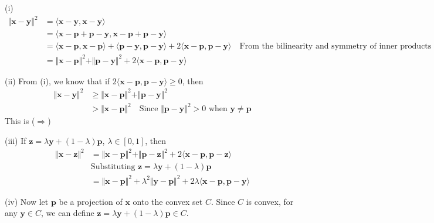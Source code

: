 \documentclass{article}
\newcommand{\inprod}[1]{\langle #1 \rangle}
\begin{document}
	\noindent(i)
	\begin{align*}
	\Vert \mathbf{x} - \mathbf{y} \Vert^2 &= \inprod{\mathbf{x}-\mathbf{y}, \mathbf{x}-\mathbf{y}} \\
	&= \inprod{\mathbf{x} - \mathbf{p} + \mathbf{p} - \mathbf{y}, \mathbf{x} - \mathbf{p} + \mathbf{p} - \mathbf{y}} \\
	&= \inprod{\mathbf{x} - \mathbf{p}, \mathbf{x} - \mathbf{p}} + \inprod{\mathbf{p} - \mathbf{y}, \mathbf{p} - \mathbf{y}} + 2 \inprod{\mathbf{x} - \mathbf{p}, \mathbf{p} - \mathbf{y}} \quad \text{From the bilinearity and symmetry of inner products} \\
	&= \Vert \mathbf{x} - \mathbf{p} \Vert^2 + \Vert \mathbf{p} - \mathbf{y} \Vert^2 + 2 \inprod{\mathbf{x} - \mathbf{p}, \mathbf{p} - \mathbf{y}}
	\end{align*}
	
	\noindent(ii)
	From (i), we know that if $2 \inprod{\mathbf{x} - \mathbf{p}, \mathbf{p} - \mathbf{y}} \geq 0$, then
	\begin{align*}
	\Vert \mathbf{x} - \mathbf{y} \Vert^2 &\geq \Vert \mathbf{x} - \mathbf{p} \Vert^2 + \Vert \mathbf{p} - \mathbf{y} \Vert^2  \\
	&> \Vert \mathbf{x} - \mathbf{p} \Vert^2 \quad \text{Since } \Vert\mathbf{p} - \mathbf{y} \Vert^2 > 0 \text{ when }\mathbf{y} \neq \mathbf{p}
	\end{align*}
	This is ($\Rightarrow$)
	
	\noindent(iii)
	If $\mathbf{z} = \lambda \mathbf{y} + (1 - \lambda) \mathbf{p}$, $\lambda \in [0,1]$, then 
	\begin{align*}
	\Vert \mathbf{x} - \mathbf{z} \Vert^2 &= \Vert \mathbf{x} - \mathbf{p} \Vert^2 + \Vert \mathbf{p} - \mathbf{z} \Vert^2 + 2 \inprod{\mathbf{x} - \mathbf{p}, \mathbf{p} - \mathbf{z}} \\
	& \text{Substituting } \mathbf{z} = \lambda \mathbf{y} + (1- \lambda) \mathbf{p} \\
	&= \Vert \mathbf{x} - \mathbf{p} \Vert^2 + \lambda^2 \Vert \mathbf{y} - \mathbf{p} \Vert^2 + 2\lambda \inprod{\mathbf{x} - \mathbf{p}, \mathbf{p} - \mathbf{y}}
	\end{align*}
	
	\noindent(iv)
	Now let $\mathbf{p}$ be a projection of $\mathbf{x}$ onto the convex set $C$. Since $C$ is convex, for any $\mathbf{y} \in C$, we can define $\mathbf{z} = \lambda \mathbf{y} + (1 - \lambda) \mathbf{p} \in C$. 
	
\end{document}
